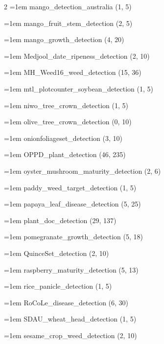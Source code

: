 \begin{multicols}{2}
\hangindent=1em mango\_\allowbreak{}detection\_\allowbreak{}australia (1, 5)\par
\hangindent=1em mango\_\allowbreak{}fruit\_\allowbreak{}stem\_\allowbreak{}detection (2, 5)\par
\hangindent=1em mango\_\allowbreak{}growth\_\allowbreak{}detection (4, 20)\par
\hangindent=1em Medjool\_\allowbreak{}date\_\allowbreak{}ripeness\_\allowbreak{}detection (2, 10)\par
\hangindent=1em MH\_\allowbreak{}Weed16\_\allowbreak{}weed\_\allowbreak{}detection (15, 36)\par
\hangindent=1em mtl\_\allowbreak{}plotcounter\_\allowbreak{}soybean\_\allowbreak{}detection (1, 5)\par
\hangindent=1em niwo\_\allowbreak{}tree\_\allowbreak{}crown\_\allowbreak{}detection (1, 5)\par
\hangindent=1em olive\_\allowbreak{}tree\_\allowbreak{}crown\_\allowbreak{}detection (0, 10)\par
\hangindent=1em onionfoliageset\_\allowbreak{}detection (3, 10)\par
\hangindent=1em OPPD\_\allowbreak{}plant\_\allowbreak{}detection (46, 235)\par
\hangindent=1em oyster\_\allowbreak{}mushroom\_\allowbreak{}maturity\_\allowbreak{}detection (2, 6)\par
\hangindent=1em paddy\_\allowbreak{}weed\_\allowbreak{}target\_\allowbreak{}detection (1, 5)\par
\hangindent=1em papaya\_\allowbreak{}leaf\_\allowbreak{}disease\_\allowbreak{}detection (5, 25)\par
\hangindent=1em plant\_\allowbreak{}doc\_\allowbreak{}detection (29, 137)\par
\hangindent=1em pomegranate\_\allowbreak{}growth\_\allowbreak{}detection (5, 18)\par
\hangindent=1em QuinceSet\_\allowbreak{}detection (2, 10)\par
\hangindent=1em raspberry\_\allowbreak{}maturity\_\allowbreak{}detection (5, 13)\par
\hangindent=1em rice\_\allowbreak{}panicle\_\allowbreak{}detection (1, 5)\par
\hangindent=1em RoCoLe\_\allowbreak{}disease\_\allowbreak{}detection (6, 30)\par
\hangindent=1em SDAU\_\allowbreak{}wheat\_\allowbreak{}head\_\allowbreak{}detection (1, 5)\par
\hangindent=1em sesame\_\allowbreak{}crop\_\allowbreak{}weed\_\allowbreak{}detection (2, 10)\par

\end{multicols}
